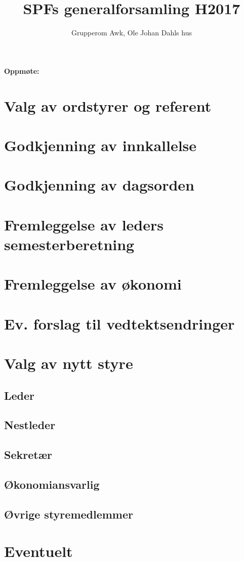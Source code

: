 \documentclass[a4paper,norsk]{article}
\title{SPFs generalforsamling H2017}
\author{Grupperom Awk, Ole Johan Dahls hus}
\begin{document}
\maketitle
\textbf{Oppmøte:
	} 
\tableofcontents

\section{Valg av ordstyrer og referent}
\section{Godkjenning av innkallelse}
\section{Godkjenning av dagsorden}
\section{Fremleggelse av leders semesterberetning}
\section{Fremleggelse av økonomi}
\section{Ev. forslag til vedtektsendringer}
\section{Valg av nytt styre}
\subsection{Leder}
\subsection{Nestleder}
\subsection{Sekretær}
\subsection{Økonomiansvarlig}
\subsection{Øvrige styremedlemmer}
\section{Eventuelt}
\end{document}
